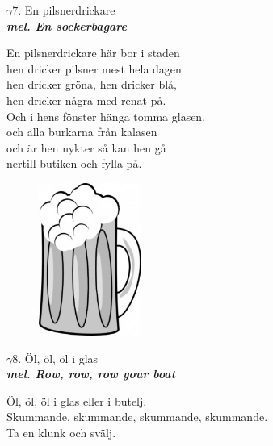 \documentclass[a6paper,10pt]{article}
\newcommand{\mel}[1]{\small\textbf{\textit{mel. #1 \\}}}
\begin{document}
\setlength{\oddsidemargin}{-0.37in}
\begin{center}
\Large $\gamma7$. En pilsnerdrickare \\ 
\mel{En sockerbagare}
\end{center}
En pilsnerdrickare här bor i staden\\
hen dricker pilsner mest hela dagen\\
hen dricker gröna, hen dricker blå,\\
hen dricker några med renat på.\\
Och i hens fönster hänga tomma glasen,\\
och alla burkarna från kalasen\\
och är hen nykter så kan hen gå\\
nertill butiken och fylla på.
\begin{figure}[!h]
\hspace{30pt}\includegraphics[width=0.3\textwidth]{ol.jpg}
\end{figure}
\begin{center}
\Large $\gamma8$. Öl, öl, öl i glas \\ 
\mel{Row, row, row your boat}
\end{center}
Öl, öl, öl i glas eller i butelj.\\
Skummande, skummande, skummande, skummande.\\
Ta en klunk och svälj.
\end{document}
